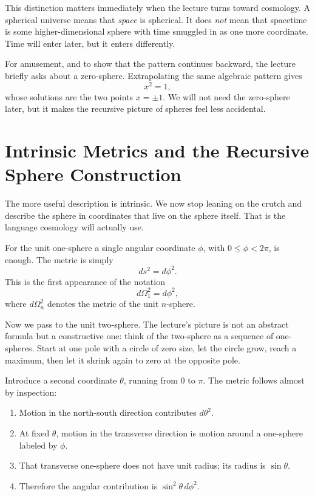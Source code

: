 This distinction matters immediately when the lecture turns toward cosmology. A spherical universe means that \emph{space} is spherical. It does \emph{not} mean that spacetime is some higher-dimensional sphere with time smuggled in as one more coordinate. Time will enter later, but it enters differently.

For amusement, and to show that the pattern continues backward, the lecture briefly asks about a zero-sphere. Extrapolating the same algebraic pattern gives
\begin{equation}
x^2=1,
\end{equation}
whose solutions are the two points \(x=\pm 1\). We will not need the zero-sphere later, but it makes the recursive picture of spheres feel less accidental.

\section{Intrinsic Metrics and the Recursive Sphere Construction}

The more useful description is intrinsic. We now stop leaning on the crutch and describe the sphere in coordinates that live on the sphere itself. That is the language cosmology will actually use.

For the unit one-sphere a single angular coordinate \(\phi\), with \(0\leq \phi < 2\pi\), is enough. The metric is simply
\begin{equation}
ds^2=d\phi^2.
\end{equation}
This is the first appearance of the notation
\begin{equation}
d\Omega_1^2=d\phi^2,
\end{equation}
where \(d\Omega_n^2\) denotes the metric of the unit \(n\)-sphere.

Now we pass to the unit two-sphere. The lecture's picture is not an abstract formula but a constructive one: think of the two-sphere as a sequence of one-spheres. Start at one pole with a circle of zero size, let the circle grow, reach a maximum, then let it shrink again to zero at the opposite pole.

Introduce a second coordinate \(\theta\), running from \(0\) to \(\pi\). The metric follows almost by inspection:

\begin{enumerate}
\item Motion in the north-south direction contributes \(d\theta^2\).
\item At fixed \(\theta\), motion in the transverse direction is motion around a one-sphere labeled by \(\phi\).
\item That transverse one-sphere does not have unit radius; its radius is \(\sin\theta\).
\item Therefore the angular contribution is \(\sin^2\theta\,d\phi^2\).
\end{enumerate}

